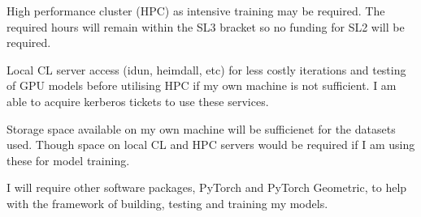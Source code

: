 High performance cluster (HPC) as intensive training may be required. The required hours will remain within the SL3 bracket so no funding for SL2 will be required. 

Local CL server access (idun, heimdall, etc) for less costly iterations and testing of GPU models before utilising HPC if my own machine is not sufficient. I am able to acquire kerberos tickets to use these services.

Storage space available on my own machine will be sufficienet for the datasets used. Though space on local CL and HPC servers would be required if I am using these for model training.

I will require other software packages, PyTorch and PyTorch Geometric, to help with the framework of building, testing and training my models.


%

%

